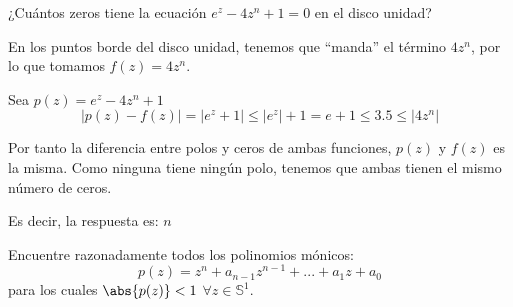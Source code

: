 \begin{problem}

¿Cuántos zeros tiene la ecuación $e^z - 4 z^n + 1 = 0$ en el disco unidad?
\solution


En los puntos borde del disco unidad, tenemos que ``manda'' el término $4z^n$, por lo que tomamos $f(z)=4z^n$.

Sea $p(z)=e^z-4z^n+1$
\[|p(z)-f(z)| = |e^z+1| \leq |e^z|+1 =e+1 \leq 3.5 \leq |4z^n|\]

Por tanto la diferencia entre polos y ceros de ambas funciones, $p(z)$ y $f(z)$ es la misma. Como ninguna tiene ningún polo, tenemos que ambas tienen el mismo número de ceros.

Es decir, la respuesta es: $n$

\end{problem}

\begin{problem}[12]
Encuentre razonadamente todos los polinomios mónicos:
\[ p(z) = z^n + a_{n-1} z^{n-1} + ... + a_1 z + a_0 \]
para los cuales $\abs{p(z)} < 1$ $\forall z \in \mathbb{S}^1$.
\solution


\end{problem}

